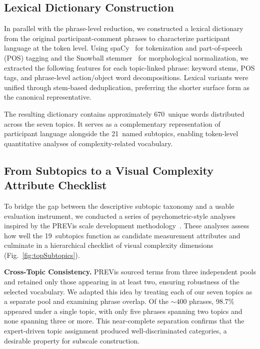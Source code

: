 \documentclass[journal]{IEEEtran}
\begin{document}
\subsection{Lexical Dictionary Construction}
\label{sec:lexicon}

In parallel with the phrase-level reduction, we constructed a lexical dictionary from the original participant-comment phrases to characterize participant language at the token level.
Using spaCy~\cite{spacy2} for tokenization and part-of-speech (POS) tagging and the Snowball stemmer~\cite{porter2001snowball} for morphological normalization, we extracted the following features for each topic-linked phrase:
keyword stems, POS tags, and phrase-level action/object word decompositions.
Lexical variants were unified through stem-based deduplication, preferring the shorter surface form as the canonical representative.

The resulting dictionary contains approximately 670~unique words distributed across the seven topics.
It serves as a complementary representation of participant language alongside the 21~named subtopics, enabling token-level quantitative analyses of complexity-related vocabulary.

\subsection{From Subtopics to a Visual Complexity Attribute Checklist}
\label{sec:checklist}

To bridge the gap between the descriptive subtopic taxonomy and a usable evaluation instrument, we conducted a series of psychometric-style analyses inspired by the PREVis scale development methodology~\cite{cabouat2024previs}. These analyses assess how well the 19~subtopics function as candidate measurement attributes and culminate in a hierarchical checklist of visual complexity dimensions (Fig.~\ref{fig:topSubtopics}).

\textbf{Cross-Topic Consistency.}
PREVis sourced terms from three independent pools and retained only those appearing in at least two, ensuring robustness of the selected vocabulary.
We adapted this idea by treating each of our seven topics as a separate pool and examining phrase overlap.
Of the ${\sim}400$ phrases, 98.7\% appeared under a single topic, with only five phrases spanning two topics and none spanning three or more.
This near-complete separation confirms that the expert-driven topic assignment produced well-discriminated categories, a desirable property for subscale construction.
\end{document}
